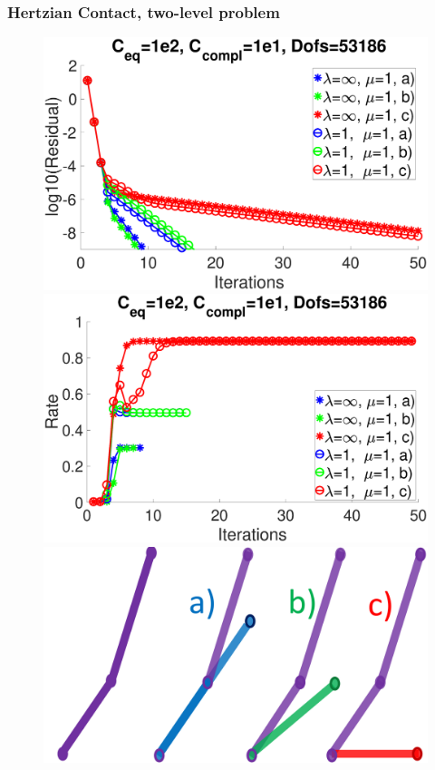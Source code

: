 \documentclass[8pt, oneside]{beamer}   	%
\newcommand{\titlecolor}[1]{\frametitle{\textcolor{dkgrey}{ \textbf{#1}}}}
\begin{document}

\begin{frame}
\titlecolor{Hertzian Contact, two-level problem}
\begin{figure}[htbp!]
	\includegraphics[scale=0.08]{img/ResidualsNonUniform.eps}
		\includegraphics[scale=0.08]{img/RatesNonUniform.eps}\\
		\includegraphics[scale=0.071]{img/coarseconstraintabc.pdf}

\end{figure}
\end{frame}
\end{document}
